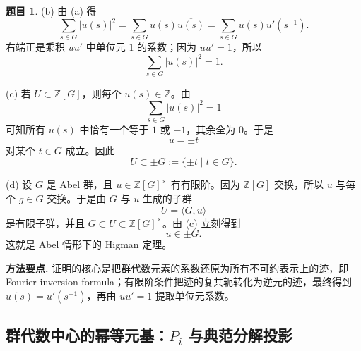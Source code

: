 \documentclass[a4paper]{ctexart}
\theoremstyle{definition}
\newtheorem{example}{题目}[section]
\theoremstyle{analysis}
\theoremstyle{plain}
\begin{document}
\begin{example}
(b) 由 (a) 得
\[
  \sum_{s\in G}|u(s)|^2
  =
  \sum_{s\in G}u(s)\overline{u(s)}
  =
  \sum_{s\in G}u(s)u'(s^{-1}).
\]
右端正是乘积 \(uu'\) 中单位元 \(1\) 的系数；因为 \(uu'=1\)，所以
\[
  \sum_{s\in G}|u(s)|^2=1.
\]

(c) 若 \(U\subset \mathbb Z[G]\)，则每个 \(u(s)\in\mathbb Z\)。由
\[
  \sum_{s\in G}|u(s)|^2=1
\]
可知所有 \(u(s)\) 中恰有一个等于 \(1\) 或 \(-1\)，其余全为 \(0\)。于是
\[
  u=\pm t
\]
对某个 \(t\in G\) 成立。因此
\[
  U\subset \pm G:=\{\pm t\mid t\in G\}.
\]

(d) 设 \(G\) 是 Abel 群，且 \(u\in \mathbb Z[G]^\times\) 有有限阶。因为 \(\mathbb Z[G]\)
交换，所以 \(u\) 与每个 \(g\in G\) 交换。于是由 \(G\) 与 \(u\) 生成的子群
\[
  U=\langle G,u\rangle
\]
是有限子群，并且 \(G\subset U\subset \mathbb Z[G]^\times\)。由 (c) 立刻得到
\[
  u\in \pm G.
\]
这就是 Abel 情形下的 Higman 定理。

\textbf{方法要点.}
证明的核心是把群代数元素的系数还原为所有不可约表示上的迹，即 Fourier inversion formula；有限阶条件把迹的复共轭转化为逆元的迹，最终得到
\(\overline{u(s)}=u'(s^{-1})\)，再由 \(uu'=1\) 提取单位元系数。
\end{example}

\subsection{\texorpdfstring{群代数中心的幂等元基：\(P_i\) 与典范分解投影}{群代数中心的幂等元基}}\label{subsec:problem-serre-center-idempotents}
\end{document}
